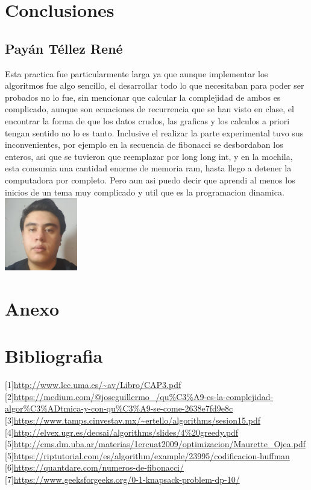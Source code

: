 \documentclass[spanish]{article}
\begin{document}
	\section{Conclusiones}			
	\subsection{Payán Téllez René}
	Esta practica fue particularmente larga ya que aunque implementar los algoritmos fue algo sencillo, el desarrollar todo lo que necesitaban para poder ser probados no lo fue, sin mencionar que calcular la complejidad de ambos es complicado, aunque son ecuaciones de recurrencia que se han visto en clase, el encontrar la forma de que los datos crudos, las graficas y los calculos a priori tengan sentido no lo es tanto. Inclusive el realizar la parte experimental tuvo sus inconvenientes, por ejemplo en la secuencia de fibonacci se desbordaban los enteros, asi que se tuvieron que reemplazar por long long int, y en la mochila, esta consumia una cantidad enorme de memoria ram, hasta llego a detener la computadora por completo. Pero aun asi puedo decir que aprendi al menos los inicios de un tema muy complicado y util que es la programacion dinamica.\\
	\includegraphics[height=120px,width=120px]{Rene}
	\section{Anexo}			
	\section{Bibliografia}
	{[}1{]}\url{http://www.lcc.uma.es/~av/Libro/CAP3.pdf}\\
	{[}2{]}\url{https://medium.com/@joseguillermo_/qu\%C3\%A9-es-la-complejidad-algor\%C3\%ADtmica-y-con-qu\%C3\%A9-se-come-2638e7fd9e8c}\\
	{[}3{]}\url{https://www.tamps.cinvestav.mx/~ertello/algorithms/sesion15.pdf	}\\		
	{[}4{]}\url{http://elvex.ugr.es/decsai/algorithms/slides/4\%20greedy.pdf}\\			
	{[}5{]}\url{http://cms.dm.uba.ar/materias/1ercuat2009/optimizacion/Maurette_Ojea.pdf}\\
	{[}5{]}\url{https://riptutorial.com/es/algorithm/example/23995/codificacion-huffman}\\	
	{[}6{]}\url{https://quantdare.com/numeros-de-fibonacci/}\\	
	{[}7{]}\url{https://www.geeksforgeeks.org/0-1-knapsack-problem-dp-10/}\\			
\end{document}
